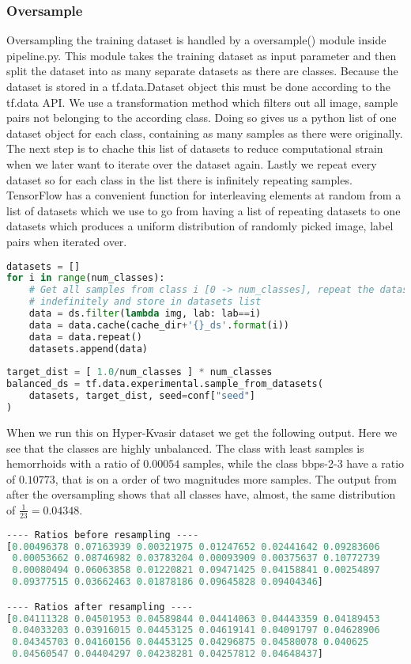 \documentclass[thesis.tex]{subfiles}
\begin{document}
\subsubsection{Oversample}
Oversampling the training dataset is handled by a oversample() module inside pipeline.py. This module takes the training dataset as input parameter and then split the dataset into as many separate datasets as there are classes. Because the dataset is stored in a tf.data.Dataset object this must be done according to the tf.data API. We use a transformation method which filters out all image, sample pairs not belonging to the according class. Doing so gives us a python list of one dataset object for each class, containing as many samples as there were originally. The next step is to chache this list of datasets to reduce computational strain when we later want to iterate over the dataset again. Lastly we repeat every dataset so for each class in the list there is infinitely repeating samples. 
TensorFlow has a convenient function for interleaving elements at random from a list of datasets which we use to go from having a list of repeating datasets to one datasets which produces a uniform distribution of randomly picked image, label pairs when iterated over.

\begin{lstlisting}[language=Python]
datasets = []
for i in range(num_classes):
    # Get all samples from class i [0 -> num_classes], repeat the dataset
    # indefinitely and store in datasets list
    data = ds.filter(lambda img, lab: lab==i)
    data = data.cache(cache_dir+'{}_ds'.format(i))
    data = data.repeat()
    datasets.append(data)
    
target_dist = [ 1.0/num_classes ] * num_classes
balanced_ds = tf.data.experimental.sample_from_datasets(
    datasets, target_dist, seed=conf["seed"]
)
\end{lstlisting}

When we run this on Hyper-Kvasir dataset we get the following output. Here we see that the classes are highly unbalanced. The class with least samples is hemorrhoids with a ratio of $0.00054$ samples, while the class bbps-2-3 have a ratio of $0.10773$, that is on a order of two magnitudes more samples. The output from after the oversampling shows that all classes have, almost, the same distribution of $\frac{1}{23}=0.04348$.

\begin{lstlisting}[language=Python]
---- Ratios before resampling ---- 
[0.00496378 0.07163939 0.00321975 0.01247652 0.02441642 0.09283606
 0.00053662 0.08746982 0.03783204 0.00093909 0.00375637 0.10772739
 0.00080494 0.06063858 0.01220821 0.09471425 0.04158841 0.00254897
 0.09377515 0.03662463 0.01878186 0.09645828 0.09404346]

---- Ratios after resampling ----
[0.04111328 0.04501953 0.04589844 0.04414063 0.04443359 0.04189453
 0.04033203 0.03916015 0.04453125 0.04619141 0.04091797 0.04628906
 0.04345703 0.04160156 0.04453125 0.04296875 0.04580078 0.040625
 0.04560547 0.04404297 0.04238281 0.04257812 0.04648437]
\end{lstlisting}
\end{document}
